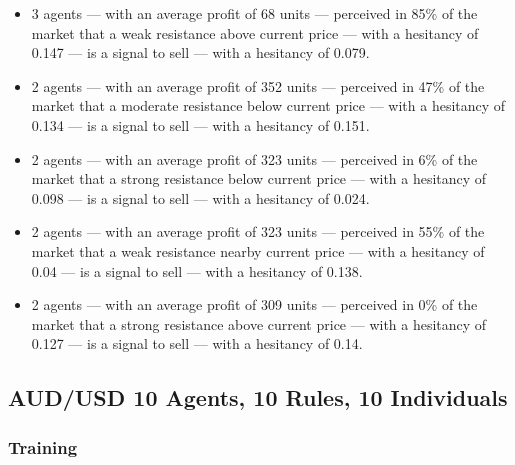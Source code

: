 {\small
  \begin{itemize}
  \item 3 agents — with an average profit of 68 units — perceived in 85\% of the
    market that a weak resistance above current price — with a hesitancy of
    0.147 — is a signal to sell — with a hesitancy of 0.079.
  \item 2 agents — with an average profit of 352 units — perceived in 47\% of
    the market that a moderate resistance below current price — with a hesitancy
    of 0.134 — is a signal to sell — with a hesitancy of 0.151.
  \item 2 agents — with an average profit of 323 units — perceived in 6\% of the
    market that a strong resistance below current price — with a hesitancy of
    0.098 — is a signal to sell — with a hesitancy of 0.024.
  \item 2 agents — with an average profit of 323 units — perceived in 55\% of
    the market that a weak resistance nearby current price — with a hesitancy of
    0.04 — is a signal to sell — with a hesitancy of 0.138.
  \item 2 agents — with an average profit of 309 units — perceived in 0\% of the
    market that a strong resistance above current price — with a hesitancy of
    0.127 — is a signal to sell — with a hesitancy of 0.14.
  \end{itemize}
}

\subsection{AUD/USD 10 Agents, 10 Rules, 10 Individuals}
\label{results:interpretation-aud-usd-10agents-10rules-10individuals}

\subsubsection{Training}

